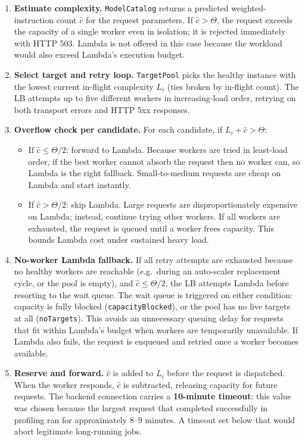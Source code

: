 \documentclass[10pt]{article}
\begin{document}
\begin{enumerate}[leftmargin=*, topsep=2pt, itemsep=1pt]
	\item \textbf{Estimate complexity.} \texttt{ModelCatalog} returns a predicted weighted-instruction count $\hat{c}$ for the request parameters. If $\hat{c} > \Theta$, the request exceeds the capacity of a single worker even in isolation; it is rejected immediately with HTTP 503. Lambda is not offered in this case because the workload would also exceed Lambda's execution budget.
	\item \textbf{Select target and retry loop.} \texttt{TargetPool} picks the healthy instance with the lowest current in-flight complexity $L_i$ (ties broken by in-flight count). The LB attempts up to five different workers in increasing-load order, retrying on both transport errors and HTTP 5xx responses.
	\item \textbf{Overflow check per candidate.} For each candidate, if $L_i + \hat{c} > \Theta$:
	      \begin{itemize}
		      \item If $\hat{c} \leq \Theta / 2$: forward to Lambda. Because workers are tried in
		            least-load order, if the best worker cannot absorb the request then no worker
		            can, so Lambda is the right fallback. Small-to-medium requests are cheap on
		            Lambda and start instantly.
		      \item If $\hat{c} > \Theta / 2$: skip Lambda. Large requests are disproportionately
		            expensive on Lambda; instead, continue trying other workers. If all workers are
		            exhausted, the request is queued until a worker frees capacity. This bounds
		            Lambda cost under sustained heavy load.
	      \end{itemize}
	\item \textbf{No-worker Lambda fallback.} If all retry attempts are exhausted because no healthy workers are reachable (e.g.\ during an auto-scaler replacement cycle, or the pool is empty), and $\hat{c} \leq \Theta / 2$, the LB attempts Lambda before resorting to the wait queue. The wait queue is triggered on either condition: capacity is fully blocked (\texttt{capacityBlocked}), or the pool has no live targets at all (\texttt{noTargets}). This avoids an unnecessary queuing delay for requests that fit within Lambda's budget when workers are temporarily unavailable. If Lambda also fails, the request is enqueued and retried once a worker becomes available.
	\item \textbf{Reserve and forward.} $\hat{c}$ is added to $L_i$ before the request is dispatched. When the worker responds, $\hat{c}$ is subtracted, releasing capacity for future requests. The backend connection carries a \textbf{10-minute timeout}: this value was chosen because the largest request that completed successfully in profiling ran for approximately 8--9 minutes. A timeout set below that would abort legitimate long-running jobs.
\end{enumerate}
\end{document}
